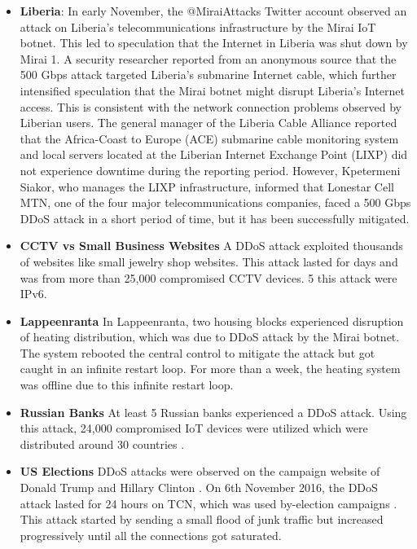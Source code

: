 \documentclass[conference]{IEEEtran}
\begin{document}
\begin{itemize}
\item{
\textbf{Liberia}: In early November, the @MiraiAttacks Twitter account observed an attack on Liberia's telecommunications infrastructure by the Mirai IoT botnet. This led to speculation that the Internet in Liberia was shut down by Mirai \cite{b2}1. A security researcher reported from an anonymous source that the 500 Gbps attack targeted Liberia’s submarine Internet cable, which further intensified speculation that the Mirai botnet might disrupt Liberia’s Internet access. This is consistent with the network connection problems observed by Liberian users. The general manager of the Liberia Cable Alliance reported that the Africa-Coast to Europe (ACE) submarine cable monitoring system and local servers located at the Liberian Internet Exchange Point (LIXP) did not experience downtime during the reporting period. However, Kpetermeni Siakor, who manages the LIXP infrastructure, informed that Lonestar Cell MTN, one of the four major telecommunications companies, faced a 500 Gbps DDoS attack in a short period of time, but it has been successfully mitigated.

}


\item{
\textbf{CCTV vs Small Business Websites}
A DDoS attack exploited thousands of websites like small jewelry shop websites. This attack lasted
for days and was from more than 25,000 compromised CCTV devices. 5%
this attack were IPv6.
}

\item{
\textbf{Lappeenranta}
In Lappeenranta, two housing blocks experienced disruption of heating distribution, which was due
to DDoS attack by the Mirai botnet. The system rebooted the central control to mitigate
the attack but got caught in an infinite restart loop. For more than a week, the heating system was
offline due to this infinite restart loop.
}


\item{\textbf{Russian Banks}
At least 5 Russian banks experienced a DDoS attack. Using this attack, 24,000 compromised IoT
devices were utilized which were distributed around 30 countries .
}


\item{\textbf{US Elections}
DDoS attacks were observed on the campaign website of Donald Trump and Hillary Clinton .
On 6th November 2016, the DDoS attack lasted for 24 hours on TCN, which was used by-election
campaigns . This attack started by sending a small flood of junk traffic but increased progressively
until all the connections got saturated.}


\end{itemize}
\end{document}
